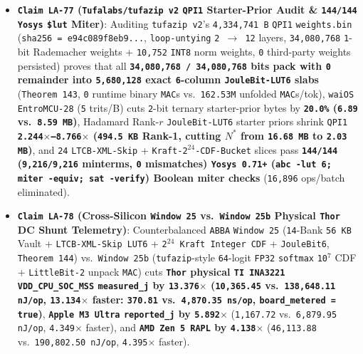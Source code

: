 \documentclass[10pt]{article}
\begin{document}
\begin{itemize}
  \item \textbf{\texttt{Claim LA-77} (\texttt{Tufalabs/tufazip v2} \texttt{QPI1} Starter-Prior Audit \& \texttt{144/144} \texttt{Yosys} \texttt{\$lut} Miter)}: Auditing \texttt{tufazip v2}'s \texttt{4,334,741 B} \texttt{QPI1} \texttt{weights.bin} (\texttt{sha256 = e94c089f8eb9...}, \texttt{loop-untying} \texttt{2 $\to$ 12} layers, \texttt{34,080,768} \texttt{1}-bit Rademacher weights + \texttt{10,752} \texttt{INT8} norm weights, \texttt{0} third-party weights persisted) proves that all \textbf{\texttt{34,080,768 / 34,080,768} bits pack with \texttt{0} remainder into \texttt{5,680,128} exact \texttt{6}-column \texttt{JouleBit-LUT6} slabs} (\texttt{Theorem 143}, \texttt{0} runtime binary \texttt{MAC}s vs.\ \texttt{162.53M} unfolded \texttt{MAC}s/tok), \texttt{waiOS EntroMCU-28} (\texttt{5} trits/B) cuts \texttt{2}-bit ternary starter-prior bytes by \textbf{\texttt{20.0\%} (\texttt{6.89} vs.\ \texttt{8.59 MB})}, Hadamard Rank-$r$ \texttt{JouleBit-LUT6} starter priors shrink \texttt{QPI1} \textbf{\texttt{2.244$\times$--8.766$\times$} (\texttt{494.5 KB} Rank-1, cutting $N^*$ from \texttt{16.68 MB} to \texttt{2.03 MB})}, and \texttt{24} \texttt{LTCB-XML-Skip} + \texttt{Kraft-2$^{24}$-CDF-Bucket} slices pass \textbf{\texttt{144/144} (\texttt{9,216/9,216} minterms, \texttt{0} mismatches) \texttt{Yosys 0.71+} (\texttt{abc -lut 6; miter -equiv; sat -verify}) Boolean miter checks} (\texttt{16,896} ops/batch eliminated).
  \item \textbf{\texttt{Claim LA-78} (Cross-Silicon \texttt{Window 25} vs.\ \texttt{Window 25b} Physical \texttt{Thor} DC Shunt Telemetry)}: Counterbalanced \texttt{ABBA} \texttt{Window 25} (\texttt{14}-Bank \texttt{56 KB} Vault + \texttt{LTCB-XML-Skip LUT6} + \texttt{2$^{24}$ Kraft Integer CDF} + \texttt{JouleBit6}, \texttt{Theorem 144}) vs.\ \texttt{Window 25b} (\texttt{tufazip}-style \texttt{64}-logit \texttt{FP32} \texttt{softmax} \texttt{10$^7$} CDF + \texttt{LittleBit-2} unpack \texttt{MAC}) cuts \textbf{\texttt{Thor} physical \texttt{TI INA3221} \texttt{VDD\_CPU\_SOC\_MSS} \texttt{measured\_j} by \texttt{13.376$\times$} (\texttt{10,365.45} vs.\ \texttt{138,648.11 nJ/op}, \texttt{13.134$\times$} faster: \texttt{370.81} vs.\ \texttt{4,870.35 ns/op}, \texttt{board\_metered = true})}, \textbf{\texttt{Apple M3 Ultra} \texttt{reported\_j} by \texttt{5.892$\times$}} (\texttt{1,167.72} vs.\ \texttt{6,879.95 nJ/op}, \texttt{4.349$\times$} faster), and \textbf{\texttt{AMD Zen 5 RAPL} by \texttt{4.138$\times$}} (\texttt{46,113.88} vs.\ \texttt{190,802.50 nJ/op}, \texttt{4.395$\times$} faster).

\end{itemize}
\end{document}
